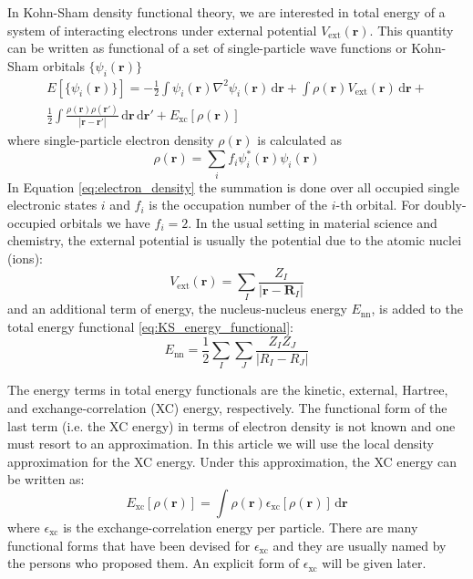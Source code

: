 In Kohn-Sham density functional theory, we are interested in total energy of a system of
interacting electrons
under external potential $V_{\mathrm{ext}}(\mathbf{r})$. This quantity can be written
as functional of
a set of single-particle wave functions or Kohn-Sham orbitals $\{\psi_{i}(\mathbf{r})\}$
\begin{multline}
E\left[\{\psi_{i}(\mathbf{r})\}\right] =
-\frac{1}{2} \int \psi_{i}(\mathbf{r}) \nabla^{2} \psi_{i}(\mathbf{r})\,\mathrm{d}\mathbf{r} +
\int \rho(\mathbf{r}) V_{\mathrm{ext}}(\mathbf{r})\,\mathrm{d}\mathbf{r} + \\
\frac{1}{2}\int
\frac{\rho(\mathbf{r}) \rho(\mathbf{r}')}{\left|\mathbf{r}-\mathbf{r}'\right|}\,
\mathrm{d}\mathbf{r}\,\mathrm{d}\mathbf{r}' + E_{\mathrm{xc}}\left[\rho(\mathbf{r})\right]
\label{eq:KS_energy_functional}
\end{multline}
%
where single-particle electron density $\rho(\mathbf{r})$ is calculated as
%
\begin{equation}
\rho(\mathbf{r}) = \sum_{i} f_{i} \psi_{i}^{*}(\mathbf{r}) \psi_{i}(\mathbf{r})
\label{eq:electron_density}
\end{equation}
%
In Equation \ref{eq:electron_density} the summation is done over
all occupied single electronic states $i$ and $f_{i}$
is the occupation number of the $i$-th orbital. For doubly-occupied orbitals
we have $f_{i}=2$.
In the usual setting in material science and chemistry, the external potential
is usually the potential due to the atomic nuclei (ions):
\begin{equation}
V_{\mathrm{ext}}(\mathbf{r}) = \sum_{I} \frac{Z_{I}}{\left|\mathbf{r} - \mathbf{R}_{I}\right|}
\end{equation}
and an additional term of energy, the nucleus-nucleus energy $E_{\mathrm{nn}}$,
is added to the total energy functional \eqref{eq:KS_energy_functional}:
\begin{equation}
E_{\mathrm{nn}} = \frac{1}{2} \sum_{I}\sum_{J}\frac{Z_{I} Z_{J}}{\left| R_{I} - R_{J} \right|}
\end{equation}

The energy terms in total energy functionals are the kinetic, external, Hartree, and exchange-correlation
(XC) energy, respectively. The functional form of the last term (i.e. the XC energy)
in terms of electron density is not known and one must resort to an approximation. In this article
we will use the local density approximation for the XC energy. Under this approximation, the XC energy
can be written as:
\begin{equation}
E_{\mathrm{xc}}\left[\rho(\mathbf{r})\right] =
\int \rho(\mathbf{r}) \epsilon_{\mathrm{xc}}\left[\rho(\mathbf{r})\right]\,\mathrm{d}\mathbf{r}
\end{equation}
where $\epsilon_{\mathrm{xc}}$ is the exchange-correlation energy per particle.
There are many functional forms that have been devised for $\epsilon_{\mathrm{xc}}$
and they are usually named by the persons who proposed them.
An explicit form of $\epsilon_{\mathrm{xc}}$ will be given later.


